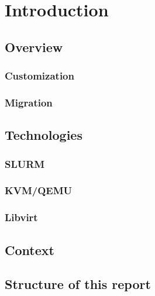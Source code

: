 \chapter{Introduction}


\section{Overview}

\subsection{Customization}

\subsection{Migration}


\section{Technologies}

\subsection{SLURM}

\subsection{KVM/QEMU}

\subsection{Libvirt}


\section{Context}


\section{Structure of this report}